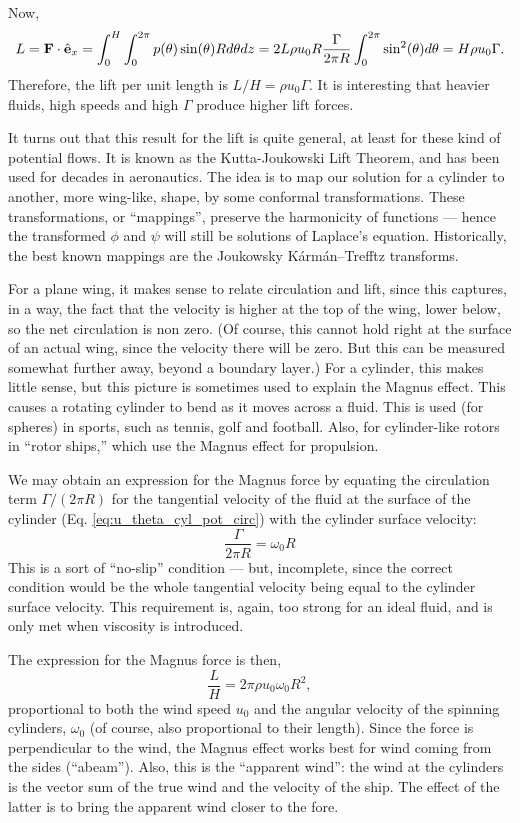 Now,
\begin{equation}
  \label{eq:lift_potential_cyl}
  L= \mathbf{F} \cdot \hat{\mathbf{e}}_x = \int_0^H \int_0^{2\pi}
  p(\theta) \sin(\theta) R d\theta dz =
  2 L  \rho u_0  R  \frac{\Gamma}{2\pi R}   \int_0^{2\pi}  \sin^2(\theta) d\theta =
  H \rho u_0   \Gamma .
\end{equation}
Therefore, the lift per unit length is $L/H= \rho u_0 \Gamma$. It is
interesting that heavier fluids, high speeds and high $\Gamma$ produce
higher lift forces.

It turns out that this result for the lift is quite general, at least
for these kind of potential flows. It is known as the Kutta-Joukowski
Lift Theorem, and has been used for decades in aeronautics. The idea
is to map our solution for a cylinder to another, more wing-like,
shape, by some conformal transformations. These transformations, or
``mappings'', preserve the harmonicity of functions --- hence the
transformed $\phi$ and $\psi$ will still be solutions of Laplace's
equation. Historically, the best known mappings are the Joukowsky
K\'arm\'an–Trefftz transforms.

For a plane wing, it makes sense to relate circulation and lift, since
this captures, in a way, the fact that the velocity is higher at the
top of the wing, lower below, so the net circulation is non zero. (Of
course, this cannot hold right at the surface of an actual wing, since
the velocity there will be zero. But this can be measured somewhat
further away, beyond a boundary layer.) For a cylinder, this makes
little sense, but this picture is sometimes used to explain the Magnus
effect. This causes a rotating cylinder to bend as it moves across a
fluid. This is used (for spheres) in sports, such as tennis, golf and
football. Also, for cylinder-like rotors in ``rotor ships,'' which use
the Magnus effect for propulsion.

We may obtain an expression for the Magnus force by equating the
circulation term $\Gamma/(2\pi R)$ for the tangential velocity
of the fluid at the surface of the cylinder
(Eq. \ref{eq:u_theta_cyl_pot_circ}) with the cylinder surface
velocity:
\[
\frac{\Gamma}{2\pi R} = \omega_0 R 
\]
This is a sort of ``no-slip'' condition --- but, incomplete,
since the correct condition would be the whole tangential velocity
being equal to the cylinder surface velocity. This requirement
is, again, too strong for an ideal fluid, and is only met when
viscosity is introduced.

The expression for the Magnus force is then,
\[
\frac{L}{H} = 2 \pi \rho u_0 \omega_0 R^2 ,
\]
proportional to both the wind speed $u_0$ and the angular
velocity of the spinning cylinders, $\omega_0$ (of course, also
proportional to their length). Since the force is perpendicular
to the wind, the Magnus effect works best for wind coming
from the sides (``abeam''). Also, this is the ``apparent wind'':
the wind at the cylinders is the vector sum of the true
wind and the velocity of the ship. The effect of the latter
is to bring the apparent wind closer to the fore.

